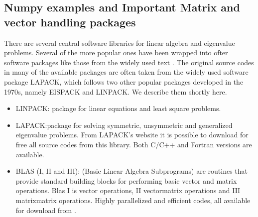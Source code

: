 \documentclass[letterpaper,10pt,english]{sphinxmanual}
\begin{document}
\subsection{Numpy examples and Important Matrix and vector handling packages}
\label{\detokenize{chapter2:numpy-examples-and-important-matrix-and-vector-handling-packages}}
There are several central software libraries for linear algebra and eigenvalue problems. Several of the more
popular ones have been wrapped into ofter software packages like those from the widely used text . The original source codes in many of the available packages are often taken from the widely used
software package LAPACK, which follows two other popular packages
developed in the 1970s, namely EISPACK and LINPACK.  We describe them shortly here.
\begin{itemize}
\item {} 
LINPACK: package for linear equations and least square problems.

\item {} 
LAPACK:package for solving symmetric, unsymmetric and generalized eigenvalue problems. From LAPACK’s website  it is possible to download for free all source codes from this library. Both C/C++ and Fortran versions are available.

\item {} 
BLAS (I, II and III): (Basic Linear Algebra Subprograms) are routines that provide standard building blocks for performing basic vector and matrix operations. Blas I is vector operations, II vector\sphinxhyphen{}matrix operations and III matrix\sphinxhyphen{}matrix operations. Highly parallelized and efficient codes, all available for download from .

\end{itemize}
\end{document}
